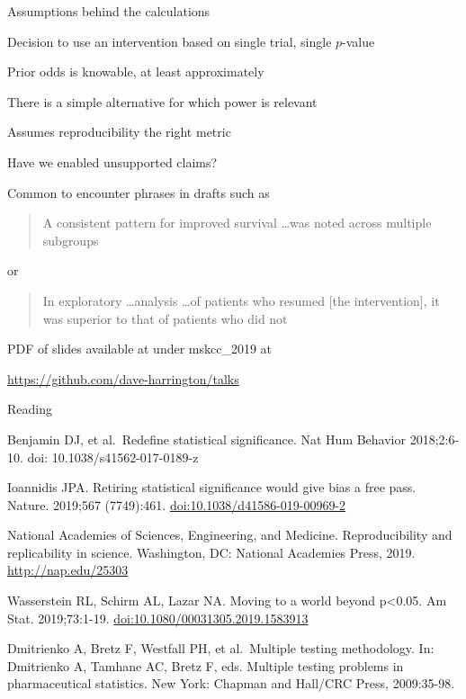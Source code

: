 \documentclass[ignorenonframetext,]{beamer}
\begin{document}
\begin{frame}{Assumptions behind the calculations}
\protect\hypertarget{assumptions-behind-the-calculations}{}

Decision to use an intervention based on single trial, single
\(p\)-value

Prior odds is knowable, at least approximately

There is a simple alternative for which power is relevant

Assumes reproducibility the right metric

\end{frame}

\begin{frame}{Have we enabled unsupported claims?}
\protect\hypertarget{have-we-enabled-unsupported-claims}{}

Common to encounter phrases in drafts such as

\begin{quote} A consistent pattern for improved survival \ldots was noted across multiple subgroups
\end{quote}

or

\begin{quote}

In exploratory \ldots analysis \ldots of patients who resumed [the intervention], it  was superior to that of patients who did not

\end{quote}

\end{frame}

\begin{frame}

PDF of slides available at under mskcc\_2019 at

\url{https://github.com/dave-harrington/talks}

\end{frame}

\begin{frame}{Reading}
\protect\hypertarget{reading}{}

\small

Benjamin DJ, et al.~Redefine statistical significance. Nat Hum Behavior
2018;2:6-10. doi: 10.1038/s41562-017-0189-z

Ioannidis JPA. Retiring statistical significance would give bias a free
pass. Nature. 2019;567 (7749):461. \url{doi:10.1038/d41586-019-00969-2}

National Academies of Sciences, Engineering, and Medicine.
Reproducibility and replicability in science. Washington, DC: National
Academies Press, 2019. \url{http://nap.edu/25303}

Wasserstein RL, Schirm AL, Lazar NA. Moving to a world beyond
p\textless{}0.05. Am Stat. 2019;73:1-19.
\url{doi:10.1080/00031305.2019.1583913}

Dmitrienko A, Bretz F, Westfall PH, et al.~Multiple testing methodology.
In: Dmitrienko A, Tamhane AC, Bretz F, eds. Multiple testing problems in
pharmaceutical statistics. New York: Chapman and Hall/CRC Press,
2009:35-98.

\end{frame}
\end{document}
